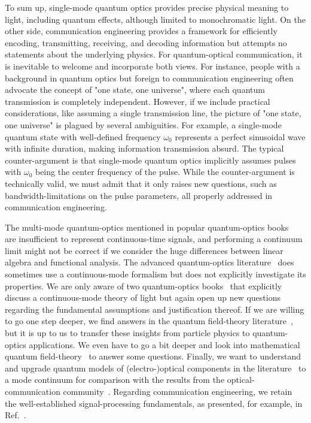 To sum up, single-mode quantum optics provides precise physical meaning to light, including quantum effects, although limited to monochromatic light.
On the other side, communication engineering provides a framework for efficiently encoding, transmitting, receiving, and decoding information but attempts no statements about the underlying physics.
For quantum-optical communication, it is inevitable to welcome and incorporate both views.
For instance, people with a background in quantum optics but foreign to communication engineering often advocate the concept of "one state, one universe", where each quantum transmission is completely independent.
However, if we include practical considerations, like assuming a single transmission line, the picture of "one state, one universe" is plagued by several ambiguities.
For example, a single-mode quantum state with well-defined frequency $\omega_0$ represents a perfect sinusoidal wave with infinite duration, making information transmission absurd.
The typical counter-argument is that single-mode quantum optics implicitly assumes pulses with $\omega_0$ being the center frequency of the pulse.
While the counter-argument is technically valid, we must admit that it only raises new questions, such as bandwidth-limitations on the pulse parameters, all properly addressed in communication engineering.

The multi-mode quantum-optics mentioned in popular quantum-optics books~\cite{Gerry2005,Fox2006} are insufficient to represent continuous-time signals, and performing a continuum limit might not be correct if we consider the huge differences between linear algebra and functional analysis.
The advanced quantum-optics literature~\cite{Vogel2006,Mandel1995} does sometimes use a continuous-mode formalism but does not explicitly investigate its properties.
We are only aware of two quantum-optics books~\cite{Loudon2000,Barnett2002} that explicitly discuss a continuous-mode theory of light but again open up new questions regarding the fundamental assumptions and justification thereof.
If we are willing to go one step deeper, we find answers in the quantum field-theory literature~\cite{Peskin1995,Srednicki2007,Greiner2013,Itzykson2012}, but it is up to us to transfer these insights from particle physics to quantum-optics applications.
We even have to go a bit deeper and look into mathematical quantum field-theory~\cite{Streater2016,Bogoliubov1982,Bogolubov1989} to answer some questions.
Finally, we want to understand and upgrade quantum models of (electro-)optical components in the literature~\cite{Vogel2006,Leonhardt2003,Haroche2006,Mandel1995} to a mode continuum for comparison with the results from the optical-communication community~\cite{Shapiro2009,Kikuchi2016}.
Regarding communication engineering, we retain the well-established signal-processing fundamentals, as presented, for example, in Ref.~\cite{Rauscher2011,Nossek2015,Madhow2008,Proakis2007,Gallager2008}.

